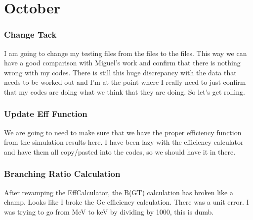 \chapter{October}
\subsection{Change Tack}
I am going to change my testing files from the  files to the 
 files. This way we can have a good comparison with Miguel's work
and confirm that there is nothing wrong with my codes. There is still this 
huge discrepancy with the  data that needs to be worked out and
I'm at the point where I really need to just confirm that my codes are doing 
what we think that they are doing. So let's get rolling.

\subsection{Update Eff Function}
We are going to need to make sure that we have the proper efficiency function 
from the simulation results here. I have been lazy with the efficiency 
calculator and have them all copy/pasted into the codes, so we should have it 
in there.

\subsection{Branching Ratio Calculation}
After revamping the EffCalculator, the B(GT) calculation has broken like a 
champ. Looks like I broke the Ge efficiency calculation. There was a unit error. 
I was trying to go from MeV to keV by dividing by 1000, this is dumb.
